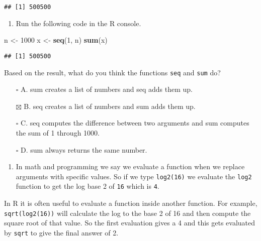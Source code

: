 \documentclass[
]{article}
\newenvironment{Shaded}{\begin{snugshade}}{\end{snugshade}}
\newcommand{\DecValTok}[1]{\textcolor[rgb]{0.00,0.00,0.81}{#1}}
\newcommand{\KeywordTok}[1]{\textcolor[rgb]{0.13,0.29,0.53}{\textbf{#1}}}
\newcommand{\NormalTok}[1]{#1}
\newcommand{\StringTok}[1]{\textcolor[rgb]{0.31,0.60,0.02}{#1}}
\providecommand{\tightlist}{%
  \setlength{\itemsep}{0pt}\setlength{\parskip}{0pt}}
\begin{document}
\begin{verbatim}
## [1] 500500
\end{verbatim}

\begin{enumerate}
\def\labelenumi{\arabic{enumi}.}
\setcounter{enumi}{2}
\tightlist
\item
  Run the following code in the R console.
\end{enumerate}

\begin{Shaded}
\begin{Highlighting}[]
\NormalTok{n <-}\StringTok{ }\DecValTok{1000}
\NormalTok{x <-}\StringTok{ }\KeywordTok{seq}\NormalTok{(}\DecValTok{1}\NormalTok{, n)}
\KeywordTok{sum}\NormalTok{(x)}
\end{Highlighting}
\end{Shaded}

\begin{verbatim}
## [1] 500500
\end{verbatim}

Based on the result, what do you think the functions \texttt{seq} and
\texttt{sum} do?

\begin{itemize}
\tightlist
\item[$\square$]
  A. sum creates a list of numbers and seq adds them up.
\item[$\boxtimes$]
  B. seq creates a list of numbers and sum adds them up.
\item[$\square$]
  C. seq computes the difference between two arguments and sum computes
  the sum of 1 through 1000.
\item[$\square$]
  D. sum always returns the same number.
\end{itemize}

\begin{enumerate}
\def\labelenumi{\arabic{enumi}.}
\setcounter{enumi}{3}
\tightlist
\item
  In math and programming we say we evaluate a function when we replace
  arguments with specific values. So if we type \texttt{log2(16)} we
  evaluate the \texttt{log2} function to get the log base 2 of
  \texttt{16} which is \texttt{4}.
\end{enumerate}

In R it is often useful to evaluate a function inside another function.
For example, \texttt{sqrt(log2(16))} will calculate the log to the base
2 of 16 and then compute the square root of that value. So the first
evaluation gives a 4 and this gets evaluated by \texttt{sqrt} to give
the final answer of 2.
\end{document}
